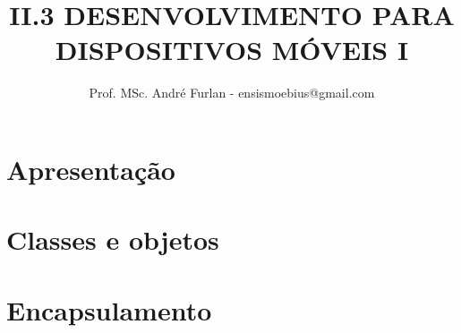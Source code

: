 

\title{II.3 DESENVOLVIMENTO PARA DISPOSITIVOS MÓVEIS I}


\author{Prof. MSc. André Furlan - ensismoebius@gmail.com}

\date{\the\year}

\newcommand{\apontar}[2]{
	\underset{\underset{#1}{\uparrow}}{\mathbf{#2}}
}


	
	\frame{\titlepage}
	
	\section{Apresentação}
		
		
	\section{Classes e objetos}
		
		
	\section{Encapsulamento}
		
		
		
	
